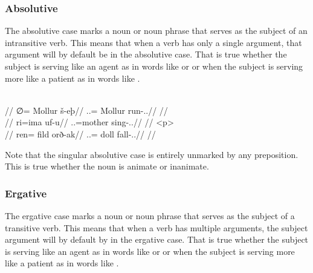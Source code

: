 \subsubsection{Absolutive}
\label{subsubsec:tvk-nouns-absolutive}

The absolutive case marks a noun or noun phrase that serves as the subject of an intransitive verb. This means that when a verb has only a single argument, that argument will by default be in the absolutive case. That is true whether the subject is serving like an agent as in words like   or   or when the subject is serving more like a patient as in words like  .

	\begingl
		\glpreamble{}\\
		//
		\gla ∅= Mollur š-eþ//
		\glb \An.\Sg.\Abs= Mollur run-\Ind.\Npst.\Prg//
		\glft{}//
	\endgl
	\a<a2>\begingl
		\glpreamble{}\\
		//
		\gla ri=ima uf-u//
		\glb \An.\Pc.\Abs=mother sing-\Ind.\Npst.\Ipfv//
		\glft{}//
	\endgl
	\begingl
		\glpreamble{}\\
		//
		\gla ren= fild orð-ak//
		\glb \In.\Pl.\Abs= doll fall-\Ind.\Pst.\Pfv//
		\glft{}//
	\endgl
\xe

Note that the singular absolutive case is entirely unmarked by any preposition. This is true whether the noun is animate or inanimate.

\subsubsection{Ergative}
\label{subsubsec:tvk-nouns-ergative}

The ergative case marks a noun or noun phrase that serves as the subject of a transitive verb. This means that when a verb has multiple arguments, the subject argument will by default by in the ergative case. That is true whether the subject is serving like an agent as in words like   or   or when the subject is serving more like a patient as in words like  .

